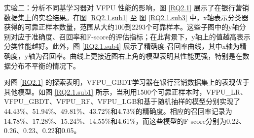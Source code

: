 实验二：分析不同基学习器对 VFPU 性能的影响，图 \ref{RQ2.1} 展示了在银行营销数据集上的实验结果。在图 \ref{RQ2.1.sub1} 至 图 \ref{RQ2.1.sub3} 中，x轴表示分类器获得的可靠正样本数量，范围从大约100到2293个可靠样本。这些子图中的y轴分别对应于准确度、召回率和F-score的评估指标；在此背景下，y轴上的值越高表示分类性能越好。此外，图 \ref{RQ2.1.sub4} 展示了精确度-召回率曲线，其中x轴为精确度，y轴为召回率。曲线上更接近图右上角的模型表明其性能更强，特别是在数据分布不平衡的情况下。

对图 \ref{RQ2.1} 的探索表明，VFPU\_GBDT学习器在银行营销数据集上的表现优于其他模型。如图 \ref{RQ2.1.sub1} 所示，当利用1500个可靠正样本时，VFPU\_LR、VFPU\_GBDT、VFPU\_RF、VFPU\_LGB和基于随机抽样的模型分别实现了44.43\%、51.94\%、49.81\%、43.72\%和4.73\%的精确度。相应的召回率记录为14.78\%、17.28\%、15.24\%、14.55\%和4.61\%，而这些模型的F-score分别为0.22、0.26、0.23、0.22和0.05。

